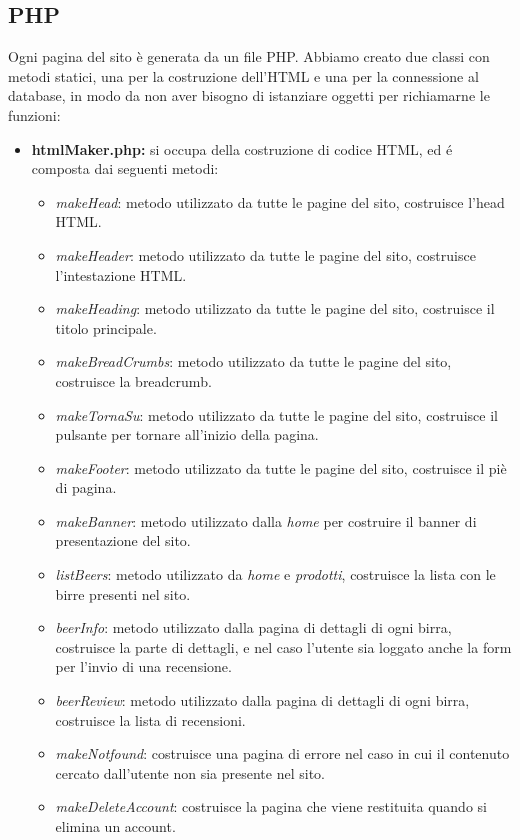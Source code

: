 \subsection{PHP}
Ogni pagina del sito è generata da un file PHP.
Abbiamo creato due classi con metodi statici, una per la costruzione dell'HTML e una per la connessione al database, in modo da non aver bisogno di istanziare oggetti per richiamarne le funzioni:
\begin{itemize}
\item \textbf{htmlMaker.php:} si occupa della costruzione di codice HTML, ed é composta dai seguenti metodi:
	\begin{itemize}
		\item \textit{makeHead}: metodo utilizzato da tutte le pagine del sito, costruisce l'head HTML.
		\item \textit{makeHeader}: metodo utilizzato da tutte le pagine del sito, costruisce l'intestazione HTML.
		\item \textit{makeHeading}: metodo utilizzato da tutte le pagine del sito, costruisce il titolo principale.
		\item \textit{makeBreadCrumbs}: metodo utilizzato da tutte le pagine del sito, costruisce la breadcrumb.
		\item \textit{makeTornaSu}: metodo utilizzato da tutte le pagine del sito, costruisce il pulsante per tornare all'inizio della pagina.
		\item \textit{makeFooter}: metodo utilizzato da tutte le pagine del sito, costruisce il piè di pagina.
		\item \textit{makeBanner}: metodo utilizzato dalla \textit{home} per costruire il banner di presentazione del sito.
		\item \textit{listBeers}: metodo utilizzato da \textit{home} e \textit{prodotti}, costruisce la lista con le birre presenti nel sito.
		\item \textit{beerInfo}: metodo utilizzato dalla pagina di dettagli di ogni birra, costruisce la parte di dettagli, e nel caso l'utente sia loggato anche la form per l'invio di una recensione. 
		\item \textit{beerReview}: metodo utilizzato dalla pagina di dettagli di ogni birra, costruisce la lista di recensioni.
		\item \textit{makeNotfound}: costruisce una pagina di errore nel caso in cui il contenuto cercato dall'utente non sia presente nel sito.
		\item \textit{makeDeleteAccount}: costruisce la pagina che viene restituita quando si elimina un account.

\end{itemize}
\end{itemize}
